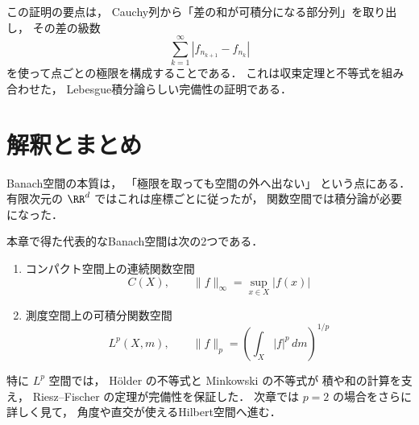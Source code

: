 \begin{remark}
この証明の要点は，
Cauchy列から「差の和が可積分になる部分列」を取り出し，
その差の級数
\[
\sum_{k=1}^{\infty}|f_{n_{k+1}}-f_{n_k}|
\]
を使って点ごとの極限を構成することである．
これは収束定理と不等式を組み合わせた，
Lebesgue積分論らしい完備性の証明である．
\end{remark}

\section{解釈とまとめ}

Banach空間の本質は，
「極限を取っても空間の外へ出ない」
という点にある．
有限次元の $\RR^d$ ではこれは座標ごとに従ったが，
関数空間では積分論が必要になった．

本章で得た代表的なBanach空間は次の2つである．
\begin{enumerate}
    \item コンパクト空間上の連続関数空間
    \[
    C(X),\qquad \|f\|_\infty=\sup_{x\in X}|f(x)|
    \]
    \item 測度空間上の可積分関数空間
    \[
    L^p(X,m),\qquad
    \|f\|_p=\left(\int_X |f|^p\,dm\right)^{1/p}
    \]
\end{enumerate}

特に $L^p$ 空間では，
Hölder の不等式と Minkowski の不等式が
積や和の計算を支え，
Riesz--Fischer の定理が完備性を保証した．
次章では $p=2$ の場合をさらに詳しく見て，
角度や直交が使えるHilbert空間へ進む．
